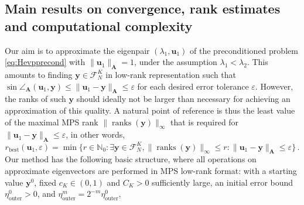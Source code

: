 \documentclass[a4paper,11pt,oneside]{amsart}
\DeclareMathOperator{\ranks}{ranks}
\providecommand{\norm}[1]{\lVert#1\rVert}
\theoremstyle{definition}
\theoremstyle{remark}
\newcommand{\cF}{{\mathcal{F}}}
\newcommand{\N}{\mathbb{N}}
\newcommand{\ten}[1]{\boldsymbol{#1}}
\newcommand{\etaout}{\eta_{\mathrm{outer}}}
\numberwithin{equation}{section}
\numberwithin{theorem}{section}
\begin{document}
\subsection{Main results on convergence, rank estimates and computational complexity}\label{sec:eocc}

Our aim is to approximate the eigenpair $(\lambda_1, \ten u_1)$ of the preconditioned problem \eqref{eq:Hevpprecond} with $\norm{\ten u_1}_{\ten A} = 1$, under the assumption $\lambda_1 < \lambda_2$. This amounts to finding $\ten y \in \cF^K_N$ in low-rank representation such that  $\sin \angle_{\ten A} (\ten u_1 , \ten y)  \leq \norm{ \ten u_1 - \ten y }_{\ten A} \leq \varepsilon$ for each desired error tolerance $\varepsilon$. However, the ranks of such $\ten y$ should ideally not be larger than necessary for achieving an approximation of this quality. A natural point of reference is thus the least value of the maximal MPS rank $\norm{\ranks(\ten y)}_\infty$ that is required for $\norm{ \ten u_1 -\ten y}_{\ten A}\leq \varepsilon$, in other words,
\begin{equation}\label{eq:defrbest}
  r_\mathrm{best}(\ten u_1, \varepsilon) = \min \bigl\{ r \in \N_0 \colon \exists \ten y \in \cF^K_N , \norm{\ranks(\ten y)}_\infty \leq r \colon  \norm{\ten u_1 - \ten y }_{\ten A} \leq \varepsilon   \bigr\}\,.
\end{equation}
%
Our method has the following basic structure, where all operations on approximate eigenvectors are performed in MPS low-rank format: with a starting value $\ten y^0$, fixed $c_K \in (0,1)$ and $C_K>0$ sufficiently large, an initial error bound $\etaout^0>0$, and $\etaout^m = 2^{-m} \etaout^0$, 
\end{document}
